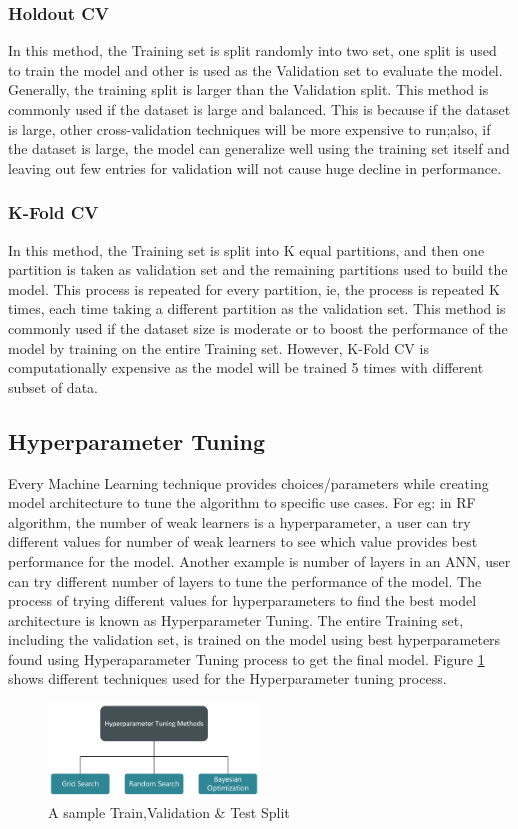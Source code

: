 \documentclass[twoside,11pt,a4paper]{article}
\begin{document}
\subsubsection{Holdout \acs{CV}}\label{sec:holdout}
In this method, the Training set is split randomly into two set, one split is used to train the model and other is used as the Validation set to evaluate the model. Generally, the training split is larger than the Validation split. This method is commonly used if the dataset is large and balanced. This is because if the dataset is large, other cross-validation techniques will be more expensive to run;also, if the dataset is large, the model can generalize well using the training set itself and leaving out few entries for validation will not cause huge decline in performance.
\subsubsection{K-Fold \acs{CV}}\label{sec:kfold}
In this method, the Training set is split into K equal partitions, and then one partition is taken as validation set and the remaining partitions used to build the model. This process is repeated for every partition, ie, the process is repeated K times, each time taking a different partition as the validation set. This method is commonly used if the dataset size is moderate or to boost the performance of the model by training on the entire Training set. However, K-Fold \acs{CV} is computationally expensive as the model will be trained 5 times with different subset of data.
\subsection{Hyperparameter Tuning}
Every Machine Learning technique provides choices/parameters while creating model architecture to tune the algorithm to specific use cases. For eg: in \acf{RF} algorithm, the number of weak learners is a hyperparameter, a user can try different values for number of weak learners to see which value provides best performance for the model. Another example is number of layers in an \acf{ANN}, user can try different number of layers to tune the performance of the model. The process of trying different values for hyperparameters to find the best model architecture is known as Hyperparameter Tuning. The entire Training set, including the validation set, is trained on the model using best hyperparameters found using Hyperaparameter Tuning process to get the final model. Figure \ref{fig:hyperparameter_tuning_methods} shows different techniques used for the Hyperparameter tuning process.
\begin{figure}[ht]
	\centering
	\includegraphics[width=0.5\textwidth]{hyperparameter_tuning_methods}
	\caption[A sample Train,Validation \& Test Split]{A sample Train,Validation \& Test Split}
	\label{fig:hyperparameter_tuning_methods}
\end{figure}
\end{document}
